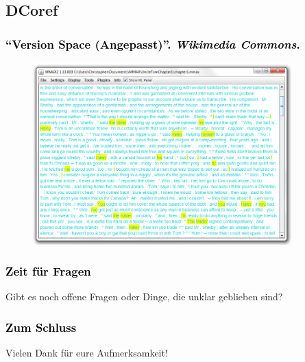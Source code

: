 \documentclass[xcolor=dvipsnames]{beamer}
\begin{document}

\subsection{DCoref}


\begin{frame}\frametitle{\textcolor{black}{``{Version Space (Angepasst)}''. \emph{Wikimedia Commons}.}}
\begin{figure}
\includegraphics[height=7cm]{cm_mmax.jpg}
\end{figure}

\end{frame}

\addtocounter{framenumber}{-3}


\begin{frame}[plain]
\frametitle{\textcolor{black}{Zeit für Fragen}}
Gibt es noch offene Fragen oder Dinge, die unklar geblieben sind?
\end{frame}

\begin{frame}[plain]
\frametitle{\textcolor{black}{Zum Schluss}}
Vielen Dank für eure Aufmerksamkeit!
\end{frame}

\end{document}
